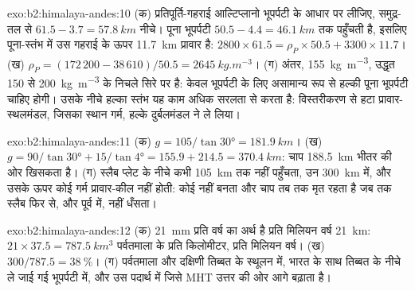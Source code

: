 \begin{solution}{exo:b2:himalaya-andes:10}
(क) प्रतिपूर्ति-गहराई आल्टिप्लानो भूपर्पटी के आधार पर लीजिए, समुद्र-तल से $61.5 - 3.7 =
\qty{57.8}{km}$ नीचे। पूना भूपर्पटी $50.5 - 4.4 = \qty{46.1}{km}$ तक पहुँचती है, इसलिए
पूना-स्तंभ में उस गहराई के ऊपर \qty{11.7}{km} प्रावार है: $2800\times61.5 =
\rho_P\times50.5 + 3300\times11.7$। (ख) $\rho_P = (172\,200 - 38\,610)/50.5 =
\qty{2645}{kg.m^{-3}}$। (ग) अंतर, \qty{155}{kg.m^{-3}}, उद्धृत 150 से \qty{200}{kg.m^{-3}} के
निचले सिरे पर है: केवल भूपर्पटी के लिए असामान्य रूप से हल्की पूना भूपर्पटी चाहिए होगी।
उसके नीचे हल्का स्तंभ यह काम अधिक सरलता से करता है: विस्तरीकरण से हटा प्रावार-स्थलमंडल,
जिसका स्थान गर्म, हल्के दुर्बलमंडल ने ले लिया।
\end{solution}

\begin{solution}{exo:b2:himalaya-andes:11}
(क) $g = 105/\tan\ang{30} = \qty{181.9}{km}$। (ख) $g = 90/\tan\ang{30} + 15/\tan\ang{4} =
155.9 + 214.5 = \qty{370.4}{km}$: चाप \qty{188.5}{km} भीतर की ओर खिसकता है। (ग) स्लैब प्लेट के नीचे कभी
\qty{105}{km} तक नहीं पहुँचता, उन \qty{300}{km} में, और उसके ऊपर कोई गर्म प्रावार-कील
नहीं होती: कोई  नहीं बनता और चाप तब तक मृत रहता है जब तक स्लैब फिर से, और पूर्व में, नहीं धँसता।
\end{solution}

\begin{solution}{exo:b2:himalaya-andes:12}
(क) \qty{21}{mm} प्रति वर्ष का अर्थ है प्रति मिलियन वर्ष \qty{21}{km}: $21\times37.5 =
\qty{787.5}{km^3}$ पर्वतमाला के प्रति किलोमीटर, प्रति मिलियन वर्ष। (ख) $300/787.5 =
\qty{38}{\percent}$। (ग) पर्वतमाला और दक्षिणी तिब्बत के स्थूलन में, भारत के साथ तिब्बत के नीचे
ले जाई गई भूपर्पटी में, और उस पदार्थ में जिसे MHT उत्तर की ओर आगे बढ़ाता है।
\end{solution}

